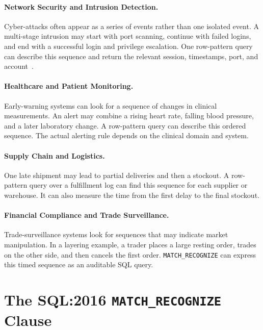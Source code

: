 \paragraph{Network Security and Intrusion Detection.}
Cyber-attacks often appear as a series of events rather than one
isolated event.  A multi-stage intrusion may start with port scanning,
continue with failed logins, and end with a successful login and
privilege escalation.  One row-pattern query can describe this
sequence and return the relevant session, timestamps, port, and
account~\cite{petkovic2022fraud}.

\paragraph{Healthcare and Patient Monitoring.}
Early-warning systems can look for a sequence of changes in clinical
measurements.  An alert may combine a rising heart rate, falling blood
pressure, and a later laboratory change.  A row-pattern query can
describe this ordered sequence.  The actual alerting rule depends on
the clinical domain and system.

\paragraph{Supply Chain and Logistics.}
One late shipment may lead to partial deliveries and then a stockout.
A row-pattern query over a fulfillment log can find this sequence for
each supplier or warehouse.  It can also measure the time from the
first delay to the final stockout.

\paragraph{Financial Compliance and Trade Surveillance.}
Trade-surveillance systems look for sequences that may indicate market
manipulation.  In a layering example, a trader places a large resting
order, trades on the other side, and then cancels the first order.
\texttt{MATCH\_RECOGNIZE} can express this timed sequence as an
auditable SQL query.

\section{The SQL:2016 \texttt{MATCH\_RECOGNIZE} Clause}
\label{sec:bg-match-recognize}

